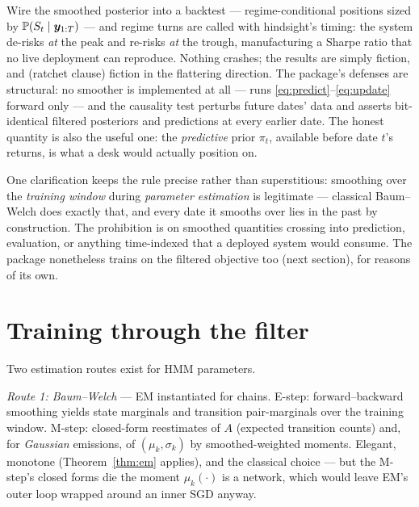 \begin{whatbreaks}
Wire the smoothed posterior into a backtest --- regime-conditional
positions sized by $\mathbb{P}(S_t \mid \bm{y}_{1:T})$ --- and regime turns are
called with hindsight's timing: the system de-risks \emph{at} the peak
and re-risks \emph{at} the trough, manufacturing a Sharpe ratio that no
live deployment can reproduce. Nothing crashes; the results are simply
fiction, and (ratchet clause) fiction in the flattering direction. The
package's defenses are structural: no smoother is implemented at all ---
 runs \eqref{eq:predict}--\eqref{eq:update}
forward only --- and the causality test perturbs future dates' data and
asserts bit-identical filtered posteriors and predictions at every
earlier date. The honest quantity is also the useful one: the
\emph{predictive} prior $\pi_t$, available before date $t$'s returns,
is what a desk would actually position on.
\end{whatbreaks}

One clarification keeps the rule precise rather than superstitious:
smoothing over the \emph{training window} during \emph{parameter
estimation} is legitimate --- classical Baum--Welch does exactly that,
and every date it smooths over lies in the past by construction. The
prohibition is on smoothed quantities crossing into prediction,
evaluation, or anything time-indexed that a deployed system would
consume. The package nonetheless trains on the filtered objective too
(next section), for reasons of its own.

\section{Training through the filter}\label{sec:bptt}

Two estimation routes exist for HMM parameters.

\emph{Route 1: Baum--Welch} --- EM instantiated for chains. E-step:
forward--backward smoothing yields state marginals and transition
pair-marginals over the training window. M-step: closed-form reestimates
of $A$ (expected transition counts) and, for \emph{Gaussian} emissions,
of $(\mu_k, \sigma_k)$ by smoothed-weighted moments. Elegant, monotone
(Theorem~\ref{thm:em} applies), and the classical choice --- but the
M-step's closed forms die the moment $\mu_k(\cdot)$ is a network, which
would leave EM's outer loop wrapped around an inner SGD anyway.

